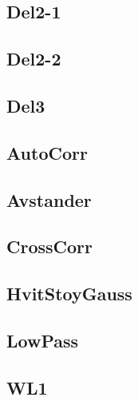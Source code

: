 \documentclass[12pt,norsk,a4paper]{article}
\begin{document}
\subsection{Del2-1}

\subsection{Del2-2}

\subsection{Del3}

\subsection{AutoCorr}

\subsection{Avstander}

\subsection{CrossCorr}

\subsection{HvitStoyGauss}

\subsection{LowPass}

\subsection{WL1}

\end{document}
